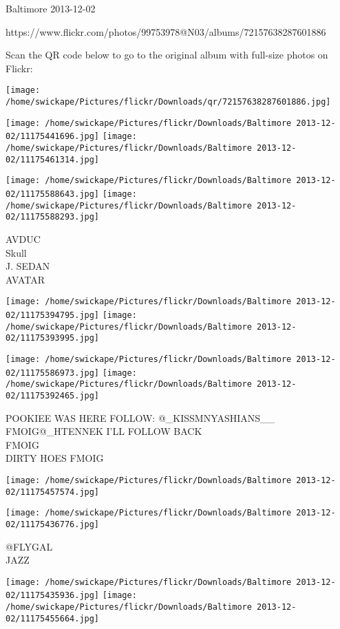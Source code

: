 \documentclass[10pt,letterpaper]{article}
\begin{document}
Baltimore 2013-12-02

https://www.flickr.com/photos/99753978@N03/albums/72157638287601886

Scan the QR code below to go to the original album with full-size photos on Flickr:

\texttt{[image: /home/swickape/Pictures/flickr/Downloads/qr/72157638287601886.jpg]}
\pagebreak

\texttt{[image: /home/swickape/Pictures/flickr/Downloads/Baltimore 2013-12-02/11175441696.jpg]}
\texttt{[image: /home/swickape/Pictures/flickr/Downloads/Baltimore 2013-12-02/11175461314.jpg]}

\texttt{[image: /home/swickape/Pictures/flickr/Downloads/Baltimore 2013-12-02/11175588643.jpg]}
\texttt{[image: /home/swickape/Pictures/flickr/Downloads/Baltimore 2013-12-02/11175588293.jpg]}

AVDUC\\
Skull\\
J. SEDAN\\
AVATAR
\pagebreak

\texttt{[image: /home/swickape/Pictures/flickr/Downloads/Baltimore 2013-12-02/11175394795.jpg]}
\texttt{[image: /home/swickape/Pictures/flickr/Downloads/Baltimore 2013-12-02/11175393995.jpg]}

\texttt{[image: /home/swickape/Pictures/flickr/Downloads/Baltimore 2013-12-02/11175586973.jpg]}
\texttt{[image: /home/swickape/Pictures/flickr/Downloads/Baltimore 2013-12-02/11175392465.jpg]}

POOKIEE WAS HERE FOLLOW: @\_KISSMNYASHIANS\_\_\\
FMOIG@\_HTENNEK I'LL FOLLOW BACK\\
FMOIG\\
DIRTY HOES FMOIG
\pagebreak

\texttt{[image: /home/swickape/Pictures/flickr/Downloads/Baltimore 2013-12-02/11175457574.jpg]}

\vspace{0.25in}
\texttt{[image: /home/swickape/Pictures/flickr/Downloads/Baltimore 2013-12-02/11175436776.jpg]}

@FLYGAL\\
JAZZ
\pagebreak

\texttt{[image: /home/swickape/Pictures/flickr/Downloads/Baltimore 2013-12-02/11175435936.jpg]}
\texttt{[image: /home/swickape/Pictures/flickr/Downloads/Baltimore 2013-12-02/11175455664.jpg]}
\end{document}

